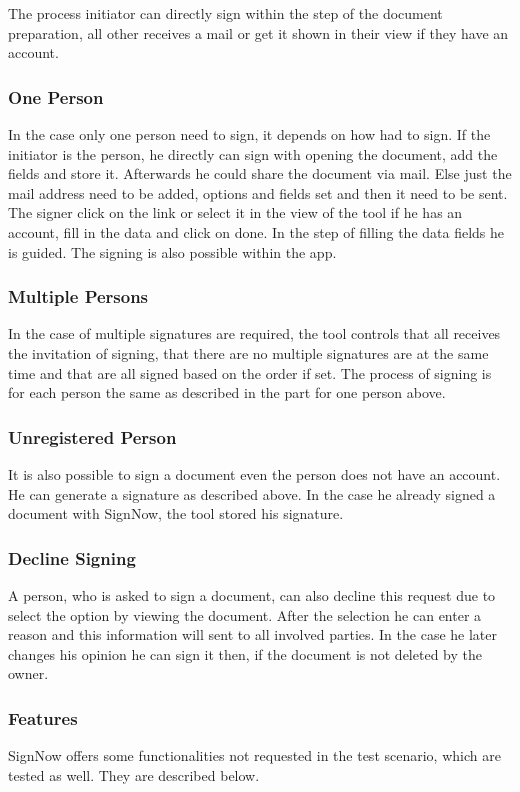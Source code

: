 The process initiator can directly sign within the step of the document preparation, all other receives a mail or get it shown in their view if they have an account.
\subsubsection{One Person}
In the case only one person need to sign, it depends on how had to sign. If the initiator is the person, he directly can sign with opening the document, add the fields and store it. Afterwards he could share the document via mail. Else just the mail address need to be added, options and fields set and then it need to be sent. The signer click on the link or select it in the view of the tool if he has an account, fill in the data and click on done. In the step of filling the data fields he is guided. The signing is also possible within the \gls{app}.

\subsubsection{Multiple Persons}
In the case of multiple signatures are required, the tool controls that all receives the invitation of signing, that there are no multiple signatures are at the same time and that are all signed based on the order if set. The process of signing is for each person the same as described in the part for one person above. 

\subsubsection{Unregistered Person}
It is also possible to sign a document even the person does not have an account. He can generate a signature as described above. In the case he already signed a document with SignNow, the tool stored his signature. 

\subsubsection{Decline Signing}
A person, who is asked to sign a document, can also decline this request due to select the option by viewing the document. After the selection he can enter a reason and this information will sent to all involved parties. In  the case he later changes his opinion he can sign it then, if the document is not deleted by the owner.

\subsubsection{Features}
SignNow offers some functionalities not requested in the test scenario, which are tested as well. They are described below.

